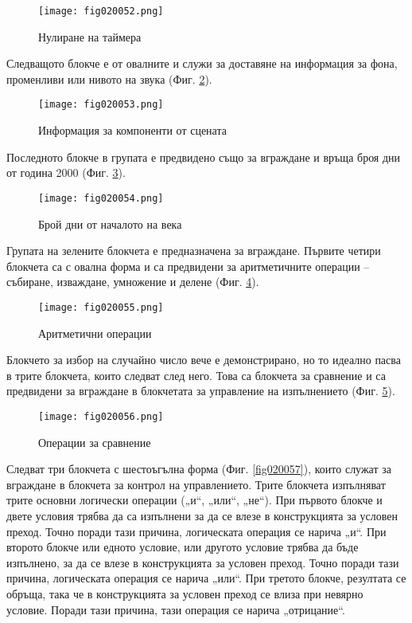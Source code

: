 \begin{figure}[H]
  \centering
  \texttt{[image: fig020052.png]}
  \caption{Нулиране на таймера}
\label{fig020052}
\end{figure}

Следващото блокче е от овалните и служи за доставяне на информация за фона, променливи или нивото на звука (Фиг. \ref{fig020053}).

\begin{figure}[H]
  \centering
  \texttt{[image: fig020053.png]}
  \caption{Информация за компоненти от сцената}
\label{fig020053}
\end{figure}

Последното блокче в групата е предвидено също за вграждане и връща броя дни от година 2000 (Фиг. \ref{fig020054}).

\begin{figure}[H]
  \centering
  \texttt{[image: fig020054.png]}
  \caption{Брой дни от началото на века}
\label{fig020054}
\end{figure}

Групата на зелените блокчета е предназначена за вграждане. Първите четири блокчета са с овална форма и са предвидени за аритметичните операции – събиране, изваждане, умножение и делене (Фиг. \ref{fig020055}).

\begin{figure}[H]
  \centering
  \texttt{[image: fig020055.png]}
  \caption{Аритметични операции}
\label{fig020055}
\end{figure}

Блокчето за избор на случайно число вече е демонстрирано, но то идеално пасва в трите блокчета, които следват след него. Това са блокчета за сравнение и са предвидени за вграждане в блокчетата за управление на изпълнението (Фиг. \ref{fig020056}).

\begin{figure}[H]
  \centering
  \texttt{[image: fig020056.png]}
  \caption{Операции за сравнение}
\label{fig020056}
\end{figure}

Следват три блокчета с шестоъгълна форма (Фиг. \ref{fig020057}), които служат за вграждане в блокчета за контрол на управлението. Трите блокчета изпълняват трите основни логически операции („и“, „или“, „не“). При първото блокче и двете условия трябва да са изпълнени за да се влезе в конструкцията за условен преход. Точно поради тази причина, логическата операция се нарича „и“. При второто блокче или едното условие, или другото условие трябва да бъде изпълнено, за да се влезе в конструкцията за условен преход. Точно поради тази причина, логическата операция се нарича „или“. При третото блокче, резултата се обръща, така че в конструкцията за условен преход се влиза при невярно условие. Поради тази причина, тази операция се нарича „отрицание“.

